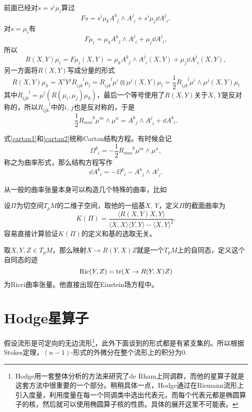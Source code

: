 前面已经对$s=s^i\mu_i$算过
\[
	F s=s^i \mu_k A^{k}_{\phantom{k}j}\wedge A^{j}_{\phantom{j}i}+s^i\mu_j\dd A^{j}_{\phantom{j}i},
\]
对$s=\mu_i$有
\[
	F \mu_i=\mu_k A^{k}_{\phantom{k}j}\wedge A^{j}_{\phantom{j}i}+\mu_j\dd A^{j}_{\phantom{j}i},
\]
所以
\[
	R(X,Y) \mu_i=F \mu_i(X,Y)=\mu_k A^{k}_{\phantom{k}j}\wedge A^{j}_{\phantom{j}i}(X,Y)+\mu_j\dd A^{j}_{\phantom{j}i}(X,Y),
\]
另一方面将$R(X,Y)$写成分量的形式
\[
	R(X,Y) \mu_k=X^iY^jR_{ijk}^{\phantom{ijk}l}\mu_l=R_{ijk}^{\phantom{ijk}l} \mu^i\otimes\mu^j(X,Y)\mu_l=\frac{1}{2}R_{ijk}^{\phantom{ijk}l} \mu^i\wedge\mu^j(X,Y)\mu_l
\]
其中$R_{ijk}^{\phantom{ijk}l}=\mu^l(R(\mu_i,\mu_j)\mu_k)$，最后一个等号使用了$R(X,Y)$关于$X$, $Y$是反对称的，所以$R_{ijk}^{\phantom{ijk}l}$中的$i$, $j$也是反对称的，于是
\begin{equation}
	\frac{1}{2}R_{mni}^{\phantom{mni}k} \mu^m\wedge\mu^n=A^{k}_{\phantom{k}j}\wedge A^{j}_{\phantom{j}i}+\dd A^{k}_{\phantom{k}i}.
	\label{cartan2}
\end{equation}

式\eqref{cartan1}和\eqref{cartan2}统称Cartan结构方程。有时候会记
\[
	\Omega^{k}_{\phantom{k}i}=-\frac{1}{2}R_{mni}^{\phantom{mni}k} \mu^m\wedge\mu^n,
\]
称之为曲率形式，那么结构方程写作
\[
	\dd A^{k}_{\phantom{k}i}=-\Omega^{k}_{\phantom{k}i}-A^{k}_{\phantom{k}j}\wedge A^{j}_{\phantom{j}i}.
\]

从一般的曲率张量本身可以构造几个特殊的曲率，比如
\begin{defi}
设$\Pi$为切空间$T_pM$的二维子空间，取他的一组基$X$, $Y$，定义$\Pi$的截面曲率为
\[
	K(\Pi)=\frac{\langle R(X,Y)X,Y\rangle}{\langle X,X\rangle\langle Y,Y \rangle-\langle X,Y \rangle^2}.
\]
容易直接计算验证$K(\Pi)$的定义和基的选取无关。
\end{defi}
\begin{defi}
取$X,Y,Z\in T_p M$，那么映射$X\to R(Y,X)Z$就是一个$T_p M$上的自同态，定义这个自同态的迹
\[
	\mathrm{Ric}(Y,Z)=\operatorname{tr} (X\to R(Y,X)Z)
\]
为Ricci曲率张量。他直接出现在Einstein场方程中。
\end{defi}
\section{Hodge星算子}
假设流形是可定向的无边流形\footnote{Hodge用一套整体分析的方法来研究了de Rham上同调群，而他的星算子就是这套方法中很重要的一个部分。稍稍具体一点，Hodge通过在Riemann流形上引入度量，利用度量在每一个同调类中选出代表元，而每个代表元都是椭圆算子的核，然后就可以使用椭圆算子核的性质。具体的展开这里不可能表。}，此外下面谈到的形式都是有紧支集的。所以根据Stokes定理，$(n-1)$-形式的外微分在整个流形上的积分为0.

